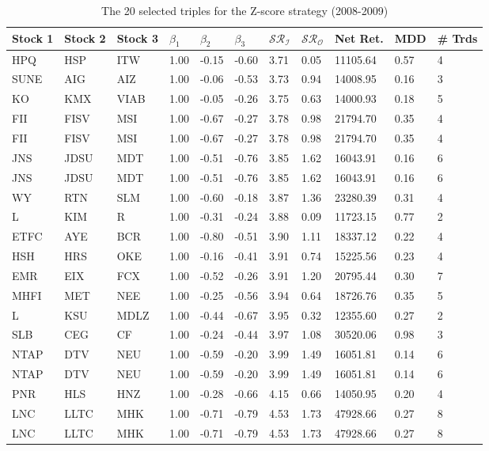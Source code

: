 \documentclass[11pt,a4,twosided,singlespacing,titlepagenumber=on]{scrreprt}
\numberwithin{equation}{chapter} %
\theoremstyle{remark}
\begin{document}
\begin{table}[H]
\centering
\begin{tabular}{lllllllllll}
\hline
Stock 1 & Stock 2 & Stock 3 & $\beta_1$ & $\beta_2$ & $\beta_3$ & $\mathcal{SR}_\mathcal{I}$ & $\mathcal{SR}_\mathcal{O}$ & Net Ret. & MDD & \# Trds\\ \hline
HPQ  & HSP  & ITW  & 1.00 & -0.15 & -0.60 & 3.71 & 0.05 & 11105.64 & 0.57 & 4 \\
SUNE  & AIG  & AIZ  & 1.00 & -0.06 & -0.53 & 3.73 & 0.94 & 14008.95 & 0.16 & 3 \\
KO  & KMX  & VIAB  & 1.00 & -0.05 & -0.26 & 3.75 & 0.63 & 14000.93 & 0.18 & 5 \\
FII  & FISV  & MSI  & 1.00 & -0.67 & -0.27 & 3.78 & 0.98 & 21794.70 & 0.35 & 4 \\
FII  & FISV  & MSI  & 1.00 & -0.67 & -0.27 & 3.78 & 0.98 & 21794.70 & 0.35 & 4 \\
JNS  & JDSU  & MDT  & 1.00 & -0.51 & -0.76 & 3.85 & 1.62 & 16043.91 & 0.16 & 6 \\
JNS  & JDSU  & MDT  & 1.00 & -0.51 & -0.76 & 3.85 & 1.62 & 16043.91 & 0.16 & 6 \\
WY  & RTN  & SLM  & 1.00 & -0.60 & -0.18 & 3.87 & 1.36 & 23280.39 & 0.31 & 4 \\
L  & KIM  & R  & 1.00 & -0.31 & -0.24 & 3.88 & 0.09 & 11723.15 & 0.77 & 2 \\
ETFC  & AYE  & BCR  & 1.00 & -0.80 & -0.51 & 3.90 & 1.11 & 18337.12 & 0.22 & 4 \\
HSH  & HRS  & OKE  & 1.00 & -0.16 & -0.41 & 3.91 & 0.74 & 15225.56 & 0.23 & 4 \\
EMR  & EIX  & FCX  & 1.00 & -0.52 & -0.26 & 3.91 & 1.20 & 20795.44 & 0.30 & 7 \\
MHFI  & MET  & NEE  & 1.00 & -0.25 & -0.56 & 3.94 & 0.64 & 18726.76 & 0.35 & 5 \\
L  & KSU  & MDLZ  & 1.00 & -0.44 & -0.67 & 3.95 & 0.32 & 12355.60 & 0.27 & 2 \\
SLB  & CEG  & CF  & 1.00 & -0.24 & -0.44 & 3.97 & 1.08 & 30520.06 & 0.98 & 3 \\
NTAP  & DTV  & NEU  & 1.00 & -0.59 & -0.20 & 3.99 & 1.49 & 16051.81 & 0.14 & 6 \\
NTAP  & DTV  & NEU  & 1.00 & -0.59 & -0.20 & 3.99 & 1.49 & 16051.81 & 0.14 & 6 \\
PNR  & HLS  & HNZ  & 1.00 & -0.28 & -0.66 & 4.15 & 0.66 & 14050.95 & 0.20 & 4 \\
LNC  & LLTC  & MHK  & 1.00 & -0.71 & -0.79 & 4.53 & 1.73 & 47928.66 & 0.27 & 8 \\
LNC  & LLTC  & MHK  & 1.00 & -0.71 & -0.79 & 4.53 & 1.73 & 47928.66 & 0.27 & 8 \\
\hline
\end{tabular}
\caption{The 20 selected triples for the Z-score strategy (2008-2009)}
\label{20_selected_triples_zscore}
\end{table}
\end{document}
